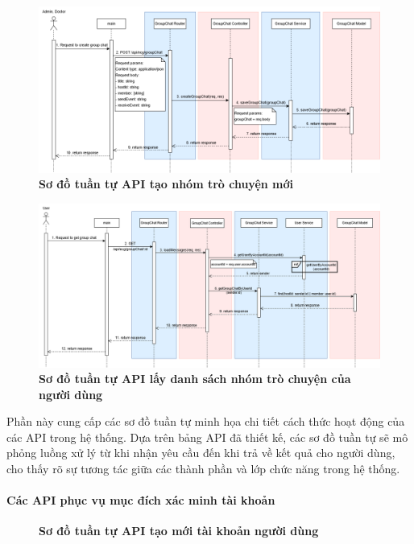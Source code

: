 \begin{figure}[H]
	\centering
	\includegraphics[width=16cm]{Images/api_sequence/chat/createGroupChat.drawio.png}
	\caption[Sơ đồ tuần tự API tạo nhóm trò chuyện mới]{\bfseries \fontsize{12pt}{0pt}\selectfont Sơ đồ tuần tự API tạo nhóm trò chuyện mới}
	\label{sequence_diagram_create_group_chat}
\end{figure}

\begin{figure}[H]
	\centering
	\includegraphics[width=16cm]{Images/api_sequence/chat/getGroupChat.drawio.png}
	\caption[Sơ đồ tuần tự API lấy danh sách nhóm trò chuyện của người dùng]{\bfseries \fontsize{12pt}{0pt}\selectfont Sơ đồ tuần tự API lấy danh sách nhóm trò chuyện của người dùng}
	\label{sequence_diagram_get_group_chat}
\end{figure}
Phần này cung cấp các sơ đồ tuần tự minh họa chi tiết cách thức hoạt động của các API trong hệ thống.
Dựa trên bảng API đã thiết kế, các sơ đồ tuần tự sẽ mô phỏng luồng xử lý từ khi nhận yêu cầu đến khi trả về kết quả cho người dùng,
cho thấy rõ sự tương tác giữa các thành phần và lớp chức năng trong hệ thống.

\paragraph{Các API phục vụ mục đích xác minh tài khoản}
\begin{figure}[H]
	\centering
	\caption[Sơ đồ tuần tự API tạo mới tài khoản người dùng]{\bfseries \fontsize{12pt}{0pt}\selectfont Sơ đồ tuần tự API tạo mới tài khoản người dùng}
	\label{sequence_diagram_create_account}
\end{figure}

